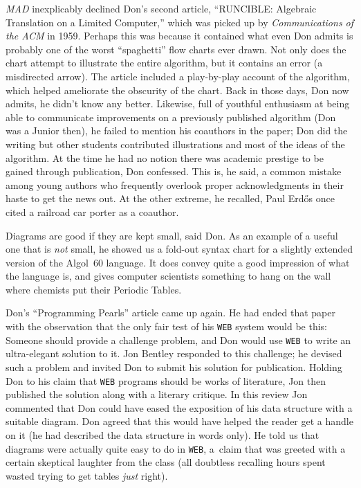 {\sl MAD\/} inexplicably declined Don's second article, ``RUNCIBLE:
Algebraic Translation on a Limited Computer,'' 
which was picked up by {\sl Communications of the ACM\/} in 1959.
Perhaps this was
because it contained what even Don admits is probably one of the worst
``spaghetti''
flow charts ever drawn. Not only does the chart attempt to illustrate
the entire algorithm, but it contains an error (a misdirected arrow).
The article included a play-by-play account of the algorithm,  which 
helped ameliorate the obscurity of the chart. Back in
those days, Don now admits, he didn't know any better. Likewise, full
of youthful enthusiasm at 
being able to communicate improvements
 on a previously  published  algorithm
(Don was a Junior then), he failed to mention his coauthors in the
paper; Don did the  writing but other students contributed
illustrations and most of the ideas of the algorithm.
 At the time he had no notion there was
academic prestige to be gained through publication, Don confessed.
This is, he said, a common mistake among young authors who frequently
overlook proper acknowledgments in their haste to get the news out.
At the other extreme, he recalled, Paul Erd{\H o}s once cited a railroad
car porter as a coauthor.

Diagrams are good if they are kept small, said Don. As an example of
a useful
one that is {\it not\/} small, he showed us a fold-out syntax chart for a
slightly extended version of the Algol~60 language. It does convey
quite a good impression of what the language is, and gives
computer scientists something to hang on the wall where chemists put
their Periodic Tables.

Don's ``Programming Pearls'' article came up again. He had ended that
paper with the observation that the only fair test of his {\tt WEB} system
would be this: Someone should provide a challenge problem, and Don
would use {\tt WEB} to write an ultra-elegant solution to it. Jon Bentley
responded to this challenge; he devised such a problem and invited Don
to submit his solution for publication. Holding Don to his claim that
{\tt WEB} programs should be works of literature, Jon then published the
solution along with a literary critique. In this review Jon commented
that Don could have eased the exposition of his data structure with a
suitable diagram. Don agreed that this would have helped the reader
get a handle on it (he had described the data structure in words
only). He told us that diagrams were actually quite easy to do in {\tt WEB},
a~claim that was greeted with a certain skeptical laughter from the
class (all doubtless recalling hours spent wasted trying to get
tables {\it just\/} right).

